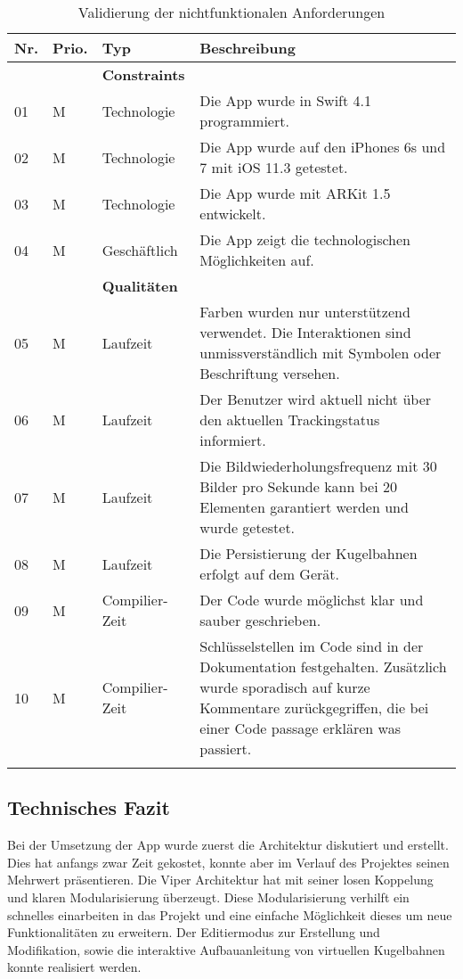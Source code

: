 \begin{longtable}{l l l p{10cm}}
	\hline
	\textbf{Nr.} & \textbf{Prio.} & \textbf{Typ} & \textbf{Beschreibung} \\
	\hline
	 & & \textbf{Constraints} & \\
	\hline
	01 & M & Technologie & Die App wurde in Swift 4.1 programmiert. \\
	\hline
	02 & M & Technologie & Die App wurde auf den iPhones 6s und 7 mit iOS 11.3 getestet. \\
	\hline
	03 & M & Technologie & Die App wurde mit ARKit 1.5 entwickelt. \\
	\hline
	04 & M & Geschäftlich & Die App zeigt die technologischen Möglichkeiten auf. \\
	\hline
	 & & \textbf{Qualitäten}& \\
	\hline
	05 & M & Laufzeit & Farben wurden nur unterstützend verwendet. Die Interaktionen sind unmissverständlich mit Symbolen oder Beschriftung versehen. \\ 
	\hline
	06 & M & Laufzeit & Der Benutzer wird aktuell nicht über den aktuellen Trackingstatus informiert. \\
	\hline
	07 & M & Laufzeit & Die Bildwiederholungsfrequenz mit 30 Bilder pro Sekunde kann bei 20 Elementen garantiert werden und wurde getestet. \\
	\hline
	08 & M & Laufzeit & Die Persistierung der Kugelbahnen erfolgt auf dem Gerät. \\
	\hline
	09 & M & Compilier-Zeit & Der Code wurde möglichst klar und sauber geschrieben. \\
	\hline
	10 & M & Compilier-Zeit & Schlüsselstellen im Code sind in der Dokumentation festgehalten. Zusätzlich wurde sporadisch auf kurze Kommentare zurückgegriffen, die bei einer Code passage erklären was passiert. \\
	\hline
	\caption{Validierung der nichtfunktionalen Anforderungen}
\end{longtable}


\subsection{Technisches Fazit}
Bei der Umsetzung der App wurde zuerst die Architektur diskutiert und erstellt. Dies hat anfangs zwar Zeit gekostet, konnte aber im Verlauf des Projektes seinen Mehrwert präsentieren. Die Viper Architektur hat mit seiner losen Koppelung und klaren Modularisierung überzeugt. Diese Modularisierung verhilft ein schnelles einarbeiten in das Projekt und eine einfache Möglichkeit dieses um neue Funktionalitäten zu erweitern. Der Editiermodus zur Erstellung und Modifikation, sowie die interaktive Aufbauanleitung von virtuellen Kugelbahnen konnte realisiert werden.

